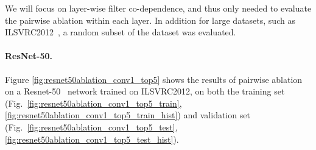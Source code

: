 \documentclass[thesis]{subfiles}
\begin{document}
We will focus on layer-wise filter co-dependence, and thus only needed to evaluate the pairwise ablation within each layer. In addition for large datasets, such as ILSVRC2012~\citep{ILSVRC2015}, a random subset of the dataset was evaluated.

\paragraph{ResNet-50.}
Figure \ref{fig:resnet50ablation_conv1_top5} shows the results of pairwise ablation on a Resnet-50~\citet{He2015} network trained on ILSVRC2012, on both the training set (Fig.~\ref{fig:resnet50ablation_conv1_top5_train},\ref{fig:resnet50ablation_conv1_top5_train_hist}) and validation set (Fig.~\ref{fig:resnet50ablation_conv1_top5_test},\ref{fig:resnet50ablation_conv1_top5_test_hist}).
\end{document}
